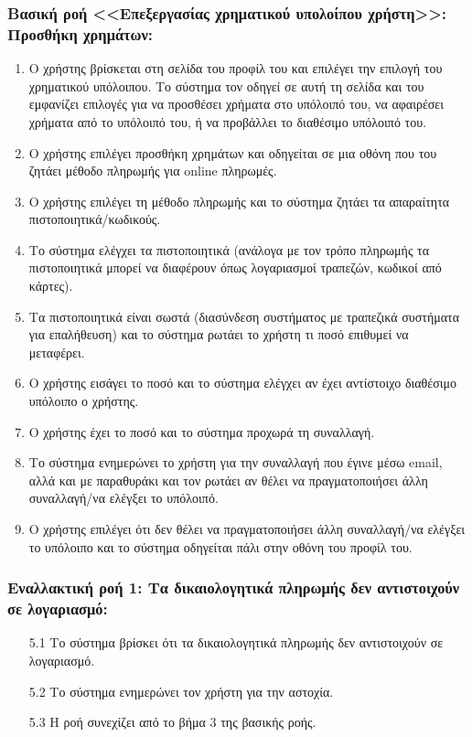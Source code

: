 \documentclass[12pt,a4paper]{article}
\begin{document}
\subsubsection*{Βασική ροή <<Επεξεργασίας χρηματικού υπολοίπου χρήστη>>: Προσθήκη χρημάτων:}
\begin{enumerate}
    \item Ο χρήστης βρίσκεται στη σελίδα του προφίλ του και επιλέγει την επιλογή του χρηματικού υπόλοιπου. Το σύστημα τον οδηγεί σε αυτή τη σελίδα και του εμφανίζει επιλογές για να προσθέσει χρήματα στο υπόλοιπό του, να αφαιρέσει χρήματα από το υπόλοιπό του, ή να προβάλλει το διαθέσιμο υπόλοιπό του.
    \item Ο χρήστης επιλέγει προσθήκη χρημάτων και οδηγείται σε μια οθόνη που του ζητάει μέθοδο πληρωμής για online πληρωμές.
    \item Ο χρήστης επιλέγει τη μέθοδο πληρωμής και το σύστημα ζητάει τα απαραίτητα πιστοποιητικά/κωδικούς.
    \item Το σύστημα ελέγχει τα πιστοποιητικά (ανάλογα με τον τρόπο πληρωμής τα πιστοποιητικά μπορεί να διαφέρουν όπως λογαριασμοί τραπεζών, κωδικοί από κάρτες).
    \item Τα πιστοποιητικά είναι σωστά (διασύνδεση συστήματος με τραπεζικά συστήματα για επαλήθευση) και το σύστημα ρωτάει το χρήστη τι ποσό επιθυμεί να μεταφέρει.
    \item Ο χρήστης εισάγει το ποσό και το σύστημα ελέγχει αν έχει αντίστοιχο διαθέσιμο υπόλοιπο ο χρήστης.
    \item Ο χρήστης έχει το ποσό και το σύστημα προχωρά τη συναλλαγή.
    \item Το σύστημα ενημερώνει το χρήστη για την συναλλαγή που έγινε μέσω email, αλλά και με παραθυράκι και τον ρωτάει αν θέλει να πραγματοποιήσει άλλη συναλλαγή/να ελέγξει το υπόλοιπό.
    \item Ο χρήστης επιλέγει ότι δεν θέλει να πραγματοποιήσει άλλη συναλλαγή/να ελέγξει το υπόλοιπο και το σύστημα οδηγείται πάλι στην οθόνη του προφίλ του.
\end{enumerate}

\subsubsection*{Εναλλακτική ροή 1: Τα δικαιολογητικά πληρωμής δεν αντιστοιχούν σε λογαριασμό:}
\begin{enumerate}
    \item [5.1] Το σύστημα βρίσκει ότι τα δικαιολογητικά πληρωμής δεν αντιστοιχούν σε λογαριασμό.
    \item [5.2] Το σύστημα ενημερώνει τον χρήστη για την αστοχία.
    \item [5.3] Η ροή συνεχίζει από το βήμα 3 της βασικής ροής.
\end{enumerate}
\end{document}
